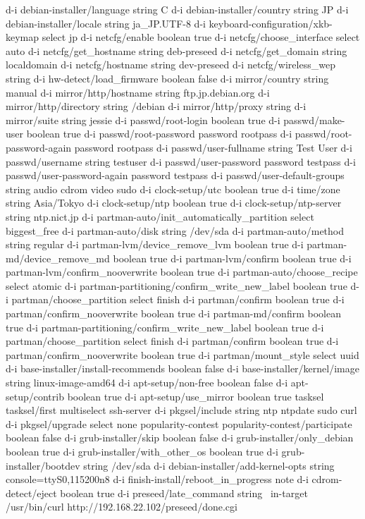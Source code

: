 \documentclass[mingoth,a4paper]{jsarticle}
\begin{document}
\begin{commandline}
  d-i debian-installer/language string C
  d-i debian-installer/country string JP
  d-i debian-installer/locale string ja_JP.UTF-8
  d-i keyboard-configuration/xkb-keymap select jp
  d-i netcfg/enable boolean true
  d-i netcfg/choose_interface select auto
  d-i netcfg/get_hostname string deb-preseed
  d-i netcfg/get_domain string localdomain
  d-i netcfg/hostname string dev-preseed
  d-i netcfg/wireless_wep string
  d-i hw-detect/load_firmware boolean false
  d-i mirror/country string manual
  d-i mirror/http/hostname string ftp.jp.debian.org
  d-i mirror/http/directory string /debian
  d-i mirror/http/proxy string
  d-i mirror/suite string jessie
  d-i passwd/root-login boolean true
  d-i passwd/make-user boolean true
  d-i passwd/root-password password rootpass
  d-i passwd/root-password-again password rootpass
  d-i passwd/user-fullname string Test User
  d-i passwd/username string testuser
  d-i passwd/user-password password testpass
  d-i passwd/user-password-again password testpass
  d-i passwd/user-default-groups string audio cdrom video sudo
  d-i clock-setup/utc boolean true
  d-i time/zone string Asia/Tokyo
  d-i clock-setup/ntp boolean true
  d-i clock-setup/ntp-server string ntp.nict.jp
  d-i partman-auto/init_automatically_partition select biggest_free
  d-i partman-auto/disk string /dev/sda
  d-i partman-auto/method string regular
  d-i partman-lvm/device_remove_lvm boolean true
  d-i partman-md/device_remove_md boolean true
  d-i partman-lvm/confirm boolean true
  d-i partman-lvm/confirm_nooverwrite boolean true
  d-i partman-auto/choose_recipe select atomic
  d-i partman-partitioning/confirm_write_new_label boolean true
  d-i partman/choose_partition select finish
  d-i partman/confirm boolean true
  d-i partman/confirm_nooverwrite boolean true
  d-i partman-md/confirm boolean true
  d-i partman-partitioning/confirm_write_new_label boolean true
  d-i partman/choose_partition select finish
  d-i partman/confirm boolean true
  d-i partman/confirm_nooverwrite boolean true
  d-i partman/mount_style select uuid
  d-i base-installer/install-recommends boolean false
  d-i base-installer/kernel/image string linux-image-amd64
  d-i apt-setup/non-free boolean false
  d-i apt-setup/contrib boolean true
  d-i apt-setup/use_mirror boolean true
  tasksel tasksel/first multiselect ssh-server
  d-i pkgsel/include string ntp ntpdate sudo curl
  d-i pkgsel/upgrade select none
  popularity-contest popularity-contest/participate boolean false
  d-i grub-installer/skip boolean false
  d-i grub-installer/only_debian boolean true
  d-i grub-installer/with_other_os boolean true
  d-i grub-installer/bootdev  string /dev/sda
  d-i debian-installer/add-kernel-opts string console=ttyS0,115200n8
  d-i finish-install/reboot_in_progress note
  d-i cdrom-detect/eject boolean true
  d-i preseed/late_command string \
  in-target /usr/bin/curl http://192.168.22.102/preseed/done.cgi
\end{commandline}
\end{document}
